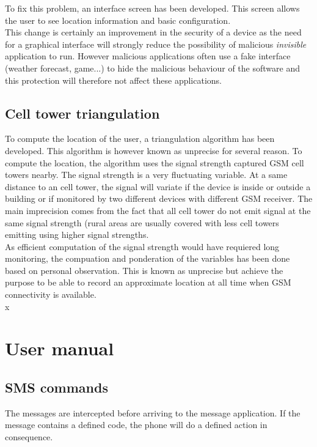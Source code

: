 To fix this problem, an interface screen has been developed.
This screen allows the user to see location information and basic configuration.\\

This change is certainly an improvement in the security of a device as the need for a graphical interface will strongly reduce the possibility of malicious \emph{invisible} application to run.
However malicious applications often use a fake interface (weather forecast, game...) to hide the malicious behaviour of the software and this protection will therefore not affect these applications.

\subsection{Cell tower triangulation}
\label{sec:dw-difficult-cell}

To compute the location of the user, a triangulation algorithm has been developed.
This algorithm is however known as unprecise for several reason.
To compute the location, the algorithm uses the signal strength captured GSM cell towers nearby.
The signal strength is a very fluctuating variable.
At a same distance to an cell tower, the signal will variate if the device is inside or outside a building or if monitored by two different devices with different GSM receiver.
The main imprecision comes from the fact that all cell tower do not emit signal at the same signal strength (rural areas are usually covered with less cell towers emitting using higher signal strengths.\\

As efficient computation of the signal strength would have requiered long monitoring, the compuation and ponderation of the variables has been done based on personal observation.
This is known as unprecise but achieve the purpose to be able to record an approximate location at all time when GSM connectivity is available.\\
x

\section{User manual}

\subsection{SMS commands}
\label{sec:dw-smscom}


The messages are intercepted before arriving to the message application. If the message contains a defined code, the phone will do a defined action in consequence.

